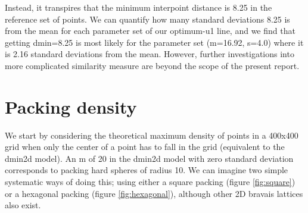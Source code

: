 \documentclass{article}
\begin{document}
Instead, it transpires that the minimum interpoint distance is 8.25 in the reference set of points. We can quantify how many standard deviations 8.25 is from the mean for each parameter set of our optimum-u1 line, and we find that getting dmin=8.25 is most likely for the parameter set (m=16.92, s=4.0) where it is 2.16 standard deviations from the mean. However, further investigations into more complicated similarity measure are beyond the scope of the present report.

\section{Packing density}

We start by considering the theoretical maximum density of points in a 400x400 grid when only the center of a point has to fall in the grid (equivalent to the dmin2d model). An m of 20 in the dmin2d model with zero standard deviation corresponds to packing hard spheres of radius 10. We can imagine two simple systematic ways of doing this; using either a square packing (figure \ref{fig:square}) or a hexagonal packing (figure \ref{fig:hexagonal}), although other 2D bravais lattices also exist.
\end{document}
